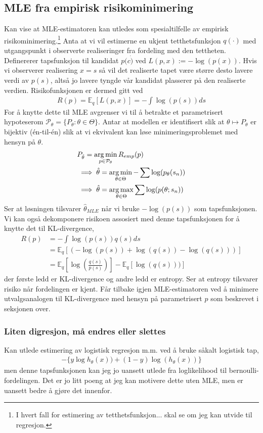 \subsection{MLE fra empirisk risikominimering}
Kan vise at MLE-estimatoren kan utledes som spesialtilfelle av empirisk risikominimering.\footnote{I hvert fall for estimering av tetthetsfunksjon... skal se om jeg kan utvide til regresjon.} Anta at vi vil estimerne en ukjent tetthetsfunksjon $q(\cdot)$ med utgangspunkt i observerte realiseringer fra fordeling med den tettheten. Definererer tapsfunksjon til kandidat $p(c\dot)$ ved $L(p,x) := -\log(p(x))$. Hvis vi observerer realisering $x=s$ så vil det realiserte tapet være større desto lavere verdi av $p(s)$, altså jo lavere tyngde vår kandidat plasserer på den realiserte verdien. Risikofunksjonen er dermed gitt ved
\begin{align}
R(p) = \mathbb{E}_q[L(p,x)] = -\int\log(p(s))ds
\end{align}
For å knytte dette til MLE avgrenser vi til å betrakte et parametrisert hypoteserom $\mathcal{P}_{\theta}=\{P_{\theta}:\theta \in \Theta\}$. Antar at modellen er identifisert slik at $\theta \mapsto P_{\theta}$ er bijektiv (én-til-én) slik at vi ekvivalent kan løse minimeringsproblemet med hensyn på $\theta$. 
\begin{align}
&P_{\hat{\theta}} = \operatorname*{arg\,min}_{p\in\mathcal{P}_{\theta}} R_{emp}(p) \\
&\implies \hat{\theta} = \operatorname*{arg\,min}_{\theta \in \Theta} -\sum \log(p_{\theta}(s_n)) \\
&\implies \hat{\theta} = \operatorname*{arg\,max}_{\theta \in \Theta} \sum \log(p(\theta;s_n))
\end{align}
Ser at løsningen tilsvarer $\hat{\theta}_{MLE}$ når vi bruke $-\log(p(s))$ som tapsfunksjonen. Vi kan også dekomponere risikoen assosiert med denne tapsfunksjonen for å knytte det til KL-divergence,
\begin{align}
R(p) &= - \int \log(p(s))q(s)ds \\
&= \mathbb{E}_q[(-\log(p(s))+\log(q(s))-\log(q(s)))] \\
&= \mathbb{E}_q\left[\log\left(\frac{q(s)}{p(s)}\right)\right]-\mathbb{E}_q[\log(q(s)))] 
\end{align}
der første ledd er KL-divergence og andre ledd er entropy. Ser at entropy tilsvarer risiko når fordelingen er kjent. Får tilbake igjen MLE-estimatoren ved å minimere utvalgsanalogen til KL-divergence med hensyn på parametrisert $p$ som beskrevet i seksjonen over.
\subsubsection{Liten digresjon, må endres eller slettes}
Kan utlede estimering av logistisk regresjon m.m. ved å bruke såkalt logistisk tap,
\begin{align}
- \{y \log h_{\theta}(x)) + (1-y)\log(h_{\theta}(x))\}
\end{align}
men denne tapsfunksjonen kan jeg jo uansett utlede fra loglikelihood til bernoulli-fordelingen. Det er jo litt poeng at jeg kan motivere dette uten MLE, men er uansett bedre å gjøre det innenfor.
